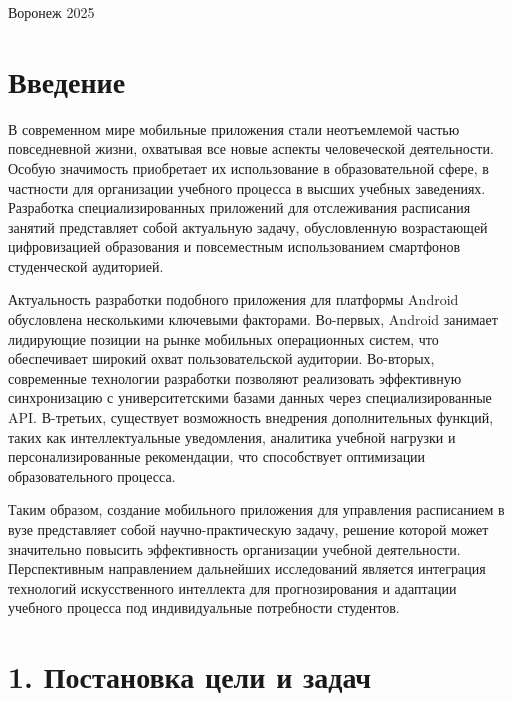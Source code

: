 \documentclass{vsureport}
\begin{document}
\begin{center} Воронеж 2025 \end{center} 

\thispagestyle{empty} %

\newpage
\thispagestyle{empty} %
\tableofcontents

\newpage

\section*{Введение}

В современном мире мобильные приложения стали неотъемлемой частью повседневной жизни, охватывая все новые аспекты человеческой деятельности. Особую значимость приобретает их использование в образовательной сфере, в частности для организации учебного процесса в высших учебных заведениях. Разработка специализированных приложений для отслеживания расписания занятий представляет собой актуальную задачу, обусловленную возрастающей цифровизацией образования и повсеместным использованием смартфонов студенческой аудиторией.

Актуальность разработки подобного приложения для платформы Android обусловлена несколькими ключевыми факторами. Во-первых, Android занимает лидирующие позиции на рынке мобильных операционных систем, что обеспечивает широкий охват пользовательской аудитории. Во-вторых, современные технологии разработки позволяют реализовать эффективную синхронизацию с университетскими базами данных через специализированные API. В-третьих, существует возможность внедрения дополнительных функций, таких как интеллектуальные уведомления, аналитика учебной нагрузки и персонализированные рекомендации, что способствует оптимизации образовательного процесса. \cite{ref1}

Таким образом, создание мобильного приложения для управления расписанием в вузе представляет собой научно-практическую задачу, решение которой может значительно повысить эффективность организации учебной деятельности. Перспективным направлением дальнейших исследований является интеграция технологий искусственного интеллекта для прогнозирования и адаптации учебного процесса под индивидуальные потребности студентов.


\newpage

\section*{1. Постановка цели и задач}
\end{document}
